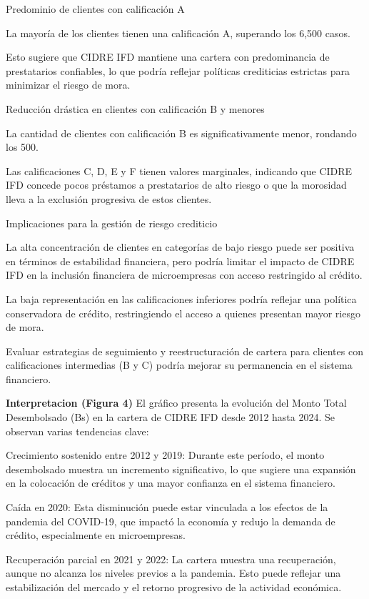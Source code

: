 \documentclass[Royal,times,sageh]{sagej}
\begin{document}
Predominio de clientes con calificación A

La mayoría de los clientes tienen una calificación A, superando los
6,500 casos.

Esto sugiere que CIDRE IFD mantiene una cartera con predominancia de
prestatarios confiables, lo que podría reflejar políticas crediticias
estrictas para minimizar el riesgo de mora.

Reducción drástica en clientes con calificación B y menores

La cantidad de clientes con calificación B es significativamente menor,
rondando los 500.

Las calificaciones C, D, E y F tienen valores marginales, indicando que
CIDRE IFD concede pocos préstamos a prestatarios de alto riesgo o que la
morosidad lleva a la exclusión progresiva de estos clientes.

Implicaciones para la gestión de riesgo crediticio

La alta concentración de clientes en categorías de bajo riesgo puede ser
positiva en términos de estabilidad financiera, pero podría limitar el
impacto de CIDRE IFD en la inclusión financiera de microempresas con
acceso restringido al crédito.

La baja representación en las calificaciones inferiores podría reflejar
una política conservadora de crédito, restringiendo el acceso a quienes
presentan mayor riesgo de mora.

Evaluar estrategias de seguimiento y reestructuración de cartera para
clientes con calificaciones intermedias (B y C) podría mejorar su
permanencia en el sistema financiero.

\textbf{Interpretacion (Figura 4)} El gráfico presenta la evolución del
Monto Total Desembolsado (Bs) en la cartera de CIDRE IFD desde 2012
hasta 2024. Se observan varias tendencias clave:

Crecimiento sostenido entre 2012 y 2019: Durante este período, el monto
desembolsado muestra un incremento significativo, lo que sugiere una
expansión en la colocación de créditos y una mayor confianza en el
sistema financiero.

Caída en 2020: Esta disminución puede estar vinculada a los efectos de
la pandemia del COVID-19, que impactó la economía y redujo la demanda de
crédito, especialmente en microempresas.

Recuperación parcial en 2021 y 2022: La cartera muestra una
recuperación, aunque no alcanza los niveles previos a la pandemia. Esto
puede reflejar una estabilización del mercado y el retorno progresivo de
la actividad económica.
\end{document}
